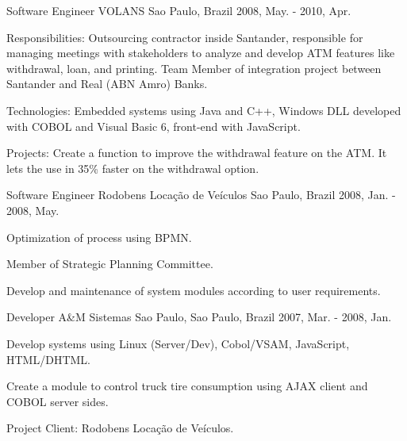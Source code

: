 \begin{cventries}
  \cventry
    {Software Engineer} %
    {VOLANS} %
    {Sao Paulo, Brazil} %
    {2008, May. - 2010, Apr.} %
    {
          \begin{cvitems} %
            \item {Responsibilities: Outsourcing contractor inside Santander, responsible for managing meetings with stakeholders to analyze and develop ATM features like withdrawal, loan, and printing. Team Member of integration project between Santander and Real (ABN Amro) Banks.}
            \item {Technologies: Embedded systems using Java and C++, Windows DLL developed with COBOL and Visual Basic 6, front-end with JavaScript.}
            \item {Projects: Create a function to improve the withdrawal feature on the ATM. It lets the use in 35\% faster on the withdrawal option.}
          \end{cvitems}
    }

  \cventry
    {Software Engineer} %
    {Rodobens Locação de Veículos} %
    {Sao Paulo, Brazil} %
    {2008, Jan. - 2008, May.} %
    {
          \begin{cvitems} %
            \item {Optimization of process using BPMN.}
            \item {Member of Strategic Planning Committee.}
            \item {Develop and maintenance of system modules according to user requirements.}
          \end{cvitems}
    }

  \cventry
    {Developer} %
    {A\&M Sistemas} %
    {Sao Paulo, Sao Paulo, Brazil} %
    {2007, Mar. - 2008, Jan.} %
    {
          \begin{cvitems} %
            \item {Develop systems using Linux (Server/Dev), Cobol/VSAM, JavaScript, HTML/DHTML.}
            \item {Create a module to control truck tire consumption using AJAX client and COBOL server sides.}
            \item {Project Client: Rodobens Locação de Veículos.}
          \end{cvitems}
    }


\end{cventries}
